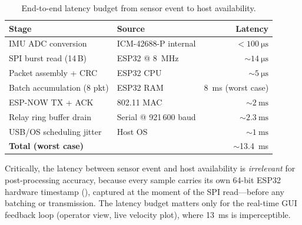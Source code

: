 \begin{table}[H]
  \centering
  \caption{End-to-end latency budget from sensor event to host availability.}
  \label{tab:latency}
  \begin{tabular}{llr}
    \toprule
    \textbf{Stage} & \textbf{Source} & \textbf{Latency} \\
    \midrule
    IMU ADC conversion         & ICM-42688-P internal      & $<\SI{100}{\micro\second}$ \\
    SPI burst read (14\,B)     & ESP32 @ \SI{8}{\mega\hertz}  & $\sim\SI{14}{\micro\second}$ \\
    Packet assembly + CRC      & ESP32 CPU                  & $\sim\SI{5}{\micro\second}$ \\
    Batch accumulation (8 pkt) & ESP32 RAM                  & \SI{8}{\milli\second} (worst case) \\
    ESP-NOW TX + ACK           & 802.11 MAC                 & $\sim\SI{2}{\milli\second}$ \\
    Relay ring buffer drain    & Serial @ 921\,600 baud     & $\sim\SI{2.3}{\milli\second}$ \\
    USB/OS scheduling jitter   & Host OS                    & $\sim\SI{1}{\milli\second}$ \\
    \midrule
    \textbf{Total (worst case)} & & $\sim$\SI{13.4}{\milli\second} \\
    \bottomrule
  \end{tabular}
\end{table}

Critically, the latency between sensor event and host availability is \emph{irrelevant} for post-processing accuracy, because every sample carries its own 64-bit ESP32 hardware timestamp (), captured at the moment of the SPI read---before any batching or transmission.
The latency budget matters only for the real-time GUI feedback loop (operator view, live velocity plot), where \SI{13}{\milli\second} is imperceptible.
